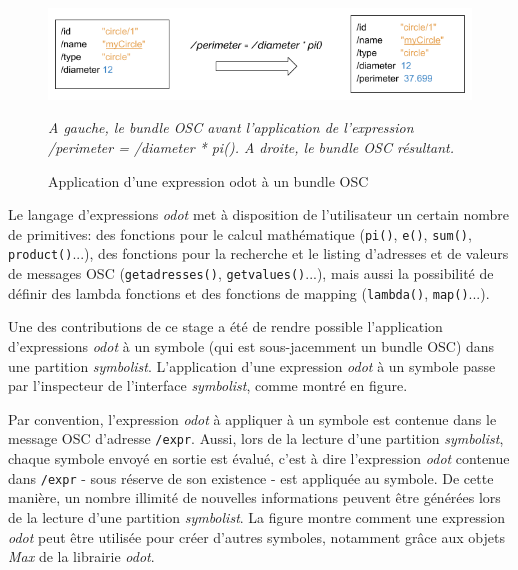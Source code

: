 \begin{figure}[H]
	\centering
	\includegraphics[keepaspectratio=true, width=\textwidth]{ModeleDeNotation/i/applyOdotExpr.png}
	\caption{Application d'une expression odot à un bundle OSC}
	\label{fig:applyOdotExpr}
	\small
	\textit{A gauche, le bundle OSC avant l'application de l'expression \emph{/perimeter = /diameter * pi()}. A droite, le bundle OSC résultant.}
\end{figure}

Le langage d'expressions \textit{odot} met à disposition de l'utilisateur un certain nombre de primitives: des fonctions pour le calcul mathématique (\texttt{pi()}, \texttt{e()}, \texttt{sum()}, \texttt{product()}...), des fonctions pour la recherche et le listing d'adresses et de valeurs de messages OSC (\texttt{getadresses()}, \texttt{getvalues()}...), mais aussi la possibilité de définir des lambda fonctions et des fonctions de mapping (\texttt{lambda()}, \texttt{map()}...).

Une des contributions de ce stage a été de rendre possible l'application d'expressions \textit{odot} à un symbole (qui est sous-jacemment un bundle OSC) dans une partition \textit{symbolist}. L'application d'une expression \textit{odot} à un symbole passe par l'inspecteur de l'interface \textit{symbolist}, comme montré en figure.


Par convention, l'expression \textit{odot} à appliquer à un symbole est contenue dans le message OSC d'adresse \texttt{/expr}.
Aussi, lors de la lecture d'une partition \textit{symbolist}, chaque symbole envoyé en sortie est évalué, c'est à dire l'expression \textit{odot} contenue dans \texttt{/expr} -  sous réserve de son existence - est appliquée au symbole.
De cette manière, un nombre illimité de nouvelles informations peuvent être générées lors de la lecture d'une partition \textit{symbolist}. La figure montre comment une expression \textit{odot} peut être utilisée pour créer d'autres symboles, notamment grâce aux objets \textit{Max} de la librairie \textit{odot}.


